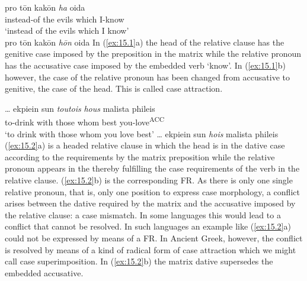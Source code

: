 \documentclass[output=paper]{langsci/langscibook}
\begin{document}
\begin{refcontext}
\ea\label{ex:15.1}
    \ea
        \gll    pro t\=on kak\=on \emph{ha} oida\\
                instead-of\textsuperscript{\Gen{}}  the evils\tss{\Gen{}}   which\tss{\Acc{}} I-know\textsuperscript{\Acc{}} \\
        \glt    ‘instead of the evils which I know’\\
    \ex pro\textsuperscript{\Gen{}}  t\=on kak\=on\tss{\Gen{}}  \emph{h\=on}\tss{\Gen{}} oida\textsuperscript{\Acc{}}
    \z
\z
In (\ref{ex:15.1}a) the head of the relative clause has the genitive case imposed by the
preposition in the matrix while the relative pronoun has the accusative
case imposed by the embedded verb ‘know’. In (\ref{ex:15.1}b) however, the case of the
relative pronoun has been changed from accusative to genitive, the case of the
head. This is called case attraction.

\ea\label{ex:15.2}
    \ea
        \gll    \dots{} ekpiein  sun         \emph{toutois}    \emph{hous}        malista phileis\\
                {} to-drink with\textsuperscript{\Dat{}} those\tss{\Dat{}} whom\tss{\Acc{}} best you-love\textsuperscript{ACC}\\
        \glt    ‘to drink with those whom you love best’
    \ex \dots{} ekpiein sun\textsuperscript{\Dat{}} \emph{hois}\tss{\Dat{}} malista phileis\textsuperscript{\Acc{}}
    \z
\z
(\ref{ex:15.2}a) is a headed relative clause in which the head is in the dative case
according to the requirements by the matrix preposition while the relative
pronoun appears in the  thereby fulfilling the case requirements
of the verb in the relative clause. (\ref{ex:15.2}b) is the corresponding FR\@. As there is
only one single relative pronoun, that is, only one position to express case
morphology, a conflict arises between the dative required by the matrix and the
accusative imposed by the relative clause: a case mismatch. In some languages
this would lead to a conflict that cannot be resolved. In such languages an
example like (\ref{ex:15.2}a) could not be expressed by means of a FR\@. In Ancient Greek,
however, the conflict is resolved by means of a kind of radical form of case
attraction which we might call case superimposition. In (\ref{ex:15.2}b) the matrix dative
supersedes the embedded accusative.


\end{refcontext}
\end{document}
